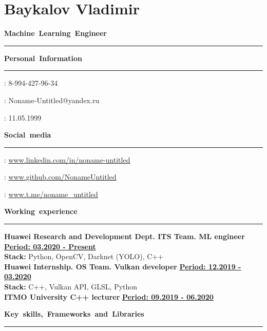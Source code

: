 \documentclass[11pt,a4paper]{report}
\author{Baykalov Vladimir}
\begin{document}
\section*{Baykalov Vladimir}

\par\hbox{\Large\textbf{Machine Learning Engineer}}\kern3pt\hrule\kern1pt

\begin{multicols}{2}
\par\hbox{\Large\textbf{Personal Information}}\kern5pt\hrule\kern5pt

\faPhone: 8-994-427-96-34

\Letter: Noname-Untitled@yandex.ru

\faBirthdayCake: 11.05.1999

\par\hbox{\Large\textbf{Social media}}\kern5pt\hrule\kern5pt

\faLinkedin : \href{https://www.linkedin.com/in/noname-untitled}{www.linkedin.com/in/noname-untitled}

\faGithub:  \href{http://www.github.com/NonameUntitled}{www.github.com/NonameUntitled}

\faSend:  \href{http://www.t.me/noname\_untitled}{www.t.me/noname\_untitled}

\end{multicols}

\par\hbox{\Large\textbf{Working experience}}\kern3pt\hrule\kern10pt


\textbf {Huawei Research and Development Dept. ITS Team. ML engineer }
\hfill
\textbf {\underline{Period: 03.2020 - Present}} \\
\textbf{Stack:} Python, OpenCV, Darknet (YOLO), C++\\


\textbf {Huawei Internship. OS Team. Vulkan developer }
\hfill
\textbf {\underline{Period: 12.2019 - 03.2020}} \\
\textbf{Stack:} C++, Vulkan API, GLSL, Python \\


\textbf {ITMO University C++ lecturer}
\hfill
\textbf {\underline{Period: 09.2019 - 06.2020}} \\


\par\hbox{\Large\textbf{Key skills, Frameworks and Libraries}}\kern5pt\hrule\kern5pt
\end{document}
